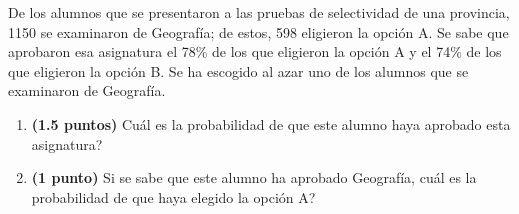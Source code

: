 
De los alumnos que se presentaron a las pruebas de selectividad de una provincia, 1150 se examinaron de Geografía; de estos, 598 eligieron la opción A. Se sabe que aprobaron esa asignatura el 78\% de los que eligieron la opción A y el 74\% de los que eligieron la opción B. Se ha escogido al azar uno de los alumnos que se examinaron de Geografía.
\begin{enumerate}[label=\alph*)]
\item \textbf{(1.5 puntos)} \textquestiondown{}Cuál es la probabilidad de que este alumno haya aprobado esta asignatura?
\item \textbf{(1 punto)} Si se sabe que este alumno ha aprobado Geografía, \textquestiondown{}cuál es la probabilidad de que haya elegido la opción A?
\end{enumerate}
